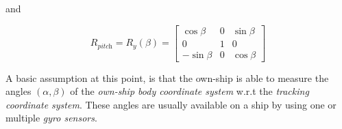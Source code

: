 and


\begin{equation}
R_{\textit{pitch}}= R_y(\beta) =
\begin{bmatrix}
\cos\beta &0 &\sin \beta\\
0 &1 &0\\
-\sin \beta &0 &\cos\beta
\end{bmatrix}
\end{equation}

A basic assumption at this point, is that the own-ship is able to measure the angles $(\alpha,\beta)$ of the \emph{own-ship body coordinate system} w.r.t the \emph{tracking coordinate system}. These angles are usually available on a ship by using one or multiple \emph{gyro sensors}.

